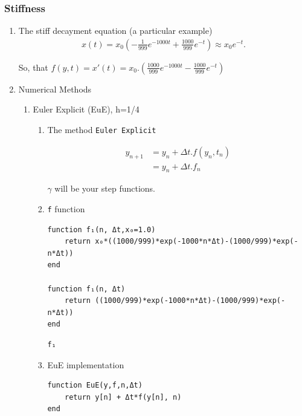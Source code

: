 \documentclass[11pt]{article}
\begin{document}
\subsubsection{Stiffness}
\label{sec:org5dde9b8}
\begin{enumerate}
\item The stiff decayment equation (a particular example)
\label{sec:orgc285e15}
\begin{equation}
\begin{aligned}
x(t)=x_{0}\left(-{\frac {1}{999}}e^{-1000t}+{\frac {1000}{999}}e^{-t}\right)\approx x_{0}e^{-t}.
\end{aligned}
\end{equation}


So, that \(f(y,t) = x'(t) = x_0.(\frac{1000}{999}e^{-1000t} - \frac{1000}{999}e^{-t})\)

\item Numerical Methods
\label{sec:org6bfd6bf}
\begin{enumerate}
\item Euler Explicit (EuE), h=1/4
\label{sec:org2b13d14}
\begin{enumerate}
\item The method
\label{sec:orge058639}
\texttt{Euler Explicit}

\begin{equation}
\begin{aligned}
y_{n+1}&=y_n + \Delta{t}.f(y_n, t_n) \\
&= y_n + \Delta{t}.f_n
\end{aligned}
\end{equation}

\(\gamma\) will be your step functions.

\item \texttt{f} function
\label{sec:orgc0d9075}
\begin{verbatim}
function f₁(n, Δt,x₀=1.0)
    return x₀*((1000/999)*exp(-1000*n*Δt)-(1000/999)*exp(-n*Δt))
end

function f₁(n, Δt)
    return ((1000/999)*exp(-1000*n*Δt)-(1000/999)*exp(-n*Δt))
end
\end{verbatim}

\begin{verbatim}
f₁
\end{verbatim}

\item EuE implementation
\label{sec:org94c9077}
\begin{verbatim}
function EuE(y,f,n,Δt)
    return y[n] + Δt*f(y[n], n)
end
\end{verbatim}


\end{enumerate}
\end{enumerate}
\end{enumerate}
\end{document}
